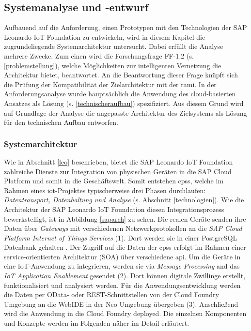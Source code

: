 \subsection{Systemanalyse und -entwurf}

Aufbauend auf die Anforderung, einen Prototypen mit den Technologien der SAP Leonardo IoT Foundation zu entwickeln, wird in diesem Kapitel die zugrundeliegende Systemarchitektur untersucht. Dabei erfüllt die Analyse mehrere Zwecke. Zum einen wird die Forschungsfrage FF-1.2 (s. \ref{problemstellung}), welche Möglichkeiten zur intelligenten Vernetzung die Architektur bietet, beantwortet. An die Beantwortung dieser Frage knüpft sich die Prüfung der Kompatibilität der Zielarchitektur mit der \ac{rami}. In der Anforderungsanalyse wurde hauptsächlich die Anwendung des cloud-basierten Ansatzes als Lösung (s. \ref{technischeraufbau}) spezifiziert. Aus diesem Grund wird auf Grundlage der Analyse die angepasste Architektur des Zielsystems als Lösung für den technischen Aufbau entworfen.

\subsubsection{Systemarchitektur}

Wie in Abschnitt \ref{leo} beschrieben, bietet die SAP Leonardo IoT Foundation zahlreiche Dienste zur Integration von physischen Geräten in die SAP Cloud Platform und somit in die Geschäftswelt. Somit entstehen \ac{cpss}, welche im Rahmen eines \ac{iot}-Projektes typischerweise drei Phasen durchlaufen: \textit{Datentransport, Datenhaltung und Analyse} (s. Abschnitt \ref{technologien}). Wie die Architektur der SAP Leonardo IoT Foundation diesen Integrationsprozess bewerkstelligt, ist in Abbildung \ref{saparch} zu sehen. Die realen Geräte senden ihre Daten über \textit{Gateways} mit verschiedenen Netzwerkprotokollen an die \textit{SAP Cloud Platform Internet of Things Services} (1). Dort werden sie in einer PostgreSQL Datenbank gehalten \citep{Acharya2019}. Der Zugriff auf die Daten der \ac{cpss} erfolgt im Rahmen einer service-orientierten Architektur (SOA) über verschiedene \ac{api}. Um die Geräte in eine IoT-Anwendung zu integrieren, werden sie via \textit{Message Processing} and das \textit{IoT Application Enablement} gesendet (2). Dort können digitale Zwillinge erstellt, funktionalisiert und analysiert werden. Für die Anwendungsentwicklung werden die Daten per OData- oder REST-Schnittstellen von der Cloud Foundry Umgebung an die WebIDE in der Neo Umgebung übergeben (3). Anschließend wird die Anwendung in die Cloud Foundry deployed. Die einzelnen Komponenten und Konzepte werden im Folgenden näher im Detail erläutert.

